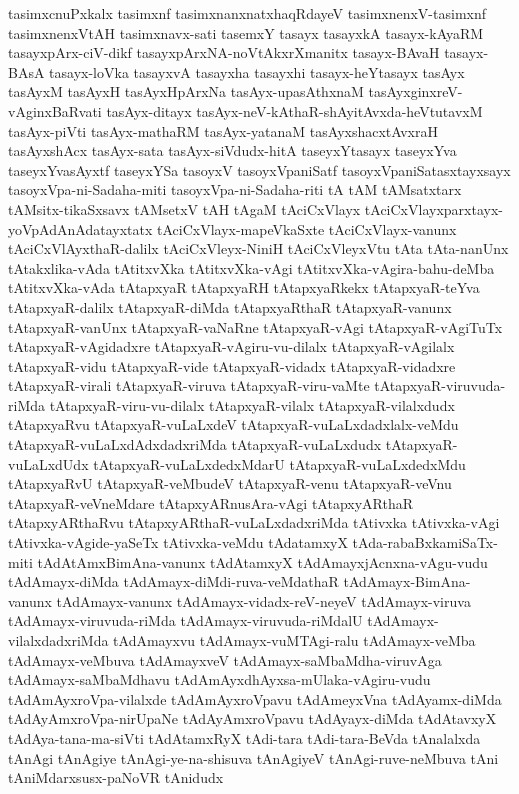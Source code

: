 {tasimxcnuPxkalx
tasimxnf
tasimxnanxnatxhaqRdayeV
tasimxnenxV-tasimxnf
tasimxnenxVtAH
tasimxnavx-sati
tasemxY
tasayx
tasayxkA
tasayx-kAyaRM
tasayxpArx-ciV-dikf
tasayxpArxNA-noVtAkxrXmanitx
tasayx-BAvaH
tasayx-BAsA
tasayx-loVka
tasayxvA
tasayxha
tasayxhi
tasayx-heYtasayx
tasAyx
tasAyxM
tasAyxH
tasAyxHpArxNa
tasAyx-upasAthxnaM
tasAyxginxreV-vAginxBaRvati
tasAyx-ditayx
tasAyx-neV-kAthaR-shAyitAvxda-heVtutavxM
tasAyx-piVti
tasAyx-mathaRM
tasAyx-yatanaM
tasAyxshacxtAvxraH
tasAyxshAcx
tasAyx-sata
tasAyx-siVdudx-hitA
taseyxYtasayx
taseyxYva
taseyxYvasAyxtf
taseyxYSa
tasoyxV
tasoyxVpaniSatf
tasoyxVpaniSatasxtayxsayx
tasoyxVpa-ni-Sadaha-miti
tasoyxVpa-ni-Sadaha-riti
tA
tAM
tAMsatxtarx
tAMsitx-tikaSxsavx
tAMsetxV
tAH
tAgaM
tAciCxVlayx
tAciCxVlayxparxtayx-yoVpAdAnAdatayxtatx
tAciCxVlayx-mapeVkaSxte
tAciCxVlayx-vanunx
tAciCxVlAyxthaR-dalilx
tAciCxVleyx-NiniH
tAciCxVleyxVtu
tAta
tAta-nanUnx
tAtakxlika-vAda
tAtitxvXka
tAtitxvXka-vAgi
tAtitxvXka-vAgira-bahu-deMba
tAtitxvXka-vAda
tAtapxyaR
tAtapxyaRH
tAtapxyaRkekx
tAtapxyaR-teYva
tAtapxyaR-dalilx
tAtapxyaR-diMda
tAtapxyaRthaR
tAtapxyaR-vanunx
tAtapxyaR-vanUnx
tAtapxyaR-vaNaRne
tAtapxyaR-vAgi
tAtapxyaR-vAgiTuTx
tAtapxyaR-vAgidadxre
tAtapxyaR-vAgiru-vu-dilalx
tAtapxyaR-vAgilalx
tAtapxyaR-vidu
tAtapxyaR-vide
tAtapxyaR-vidadx
tAtapxyaR-vidadxre
tAtapxyaR-virali
tAtapxyaR-viruva
tAtapxyaR-viru-vaMte
tAtapxyaR-viruvuda-riMda
tAtapxyaR-viru-vu-dilalx
tAtapxyaR-vilalx
tAtapxyaR-vilalxdudx
tAtapxyaRvu
tAtapxyaR-vuLaLxdeV
tAtapxyaR-vuLaLxdadxlalx-veMdu
tAtapxyaR-vuLaLxdAdxdadxriMda
tAtapxyaR-vuLaLxdudx
tAtapxyaR-vuLaLxdUdx
tAtapxyaR-vuLaLxdedxMdarU
tAtapxyaR-vuLaLxdedxMdu
tAtapxyaRvU
tAtapxyaR-veMbudeV
tAtapxyaR-venu
tAtapxyaR-veVnu
tAtapxyaR-veVneMdare
tAtapxyARnusAra-vAgi
tAtapxyARthaR
tAtapxyARthaRvu
tAtapxyARthaR-vuLaLxdadxriMda
tAtivxka
tAtivxka-vAgi
tAtivxka-vAgide-yaSeTx
tAtivxka-veMdu
tAdatamxyX
tAda-rabaBxkamiSaTx-miti
tAdAtAmxBimAna-vanunx
tAdAtamxyX
tAdAmayxjAcnxna-vAgu-vudu
tAdAmayx-diMda
tAdAmayx-diMdi-ruva-veMdathaR
tAdAmayx-BimAna-vanunx
tAdAmayx-vanunx
tAdAmayx-vidadx-reV-neyeV
tAdAmayx-viruva
tAdAmayx-viruvuda-riMda
tAdAmayx-viruvuda-riMdalU
tAdAmayx-vilalxdadxriMda
tAdAmayxvu
tAdAmayx-vuMTAgi-ralu
tAdAmayx-veMba
tAdAmayx-veMbuva
tAdAmayxveV
tAdAmayx-saMbaMdha-viruvAga
tAdAmayx-saMbaMdhavu
tAdAmAyxdhAyxsa-mUlaka-vAgiru-vudu
tAdAmAyxroVpa-vilalxde
tAdAmAyxroVpavu
tAdAmeyxVna
tAdAyamx-diMda
tAdAyAmxroVpa-nirUpaNe
tAdAyAmxroVpavu
tAdAyayx-diMda
tAdAtavxyX
tAdAya-tana-ma-siVti
tAdAtamxRyX
tAdi-tara
tAdi-tara-BeVda
tAnalalxda
tAnAgi
tAnAgiye
tAnAgi-ye-na-shisuva
tAnAgiyeV
tAnAgi-ruve-neMbuva
tAni
tAniMdarxsusx-paNoVR
tAnidudx
}
